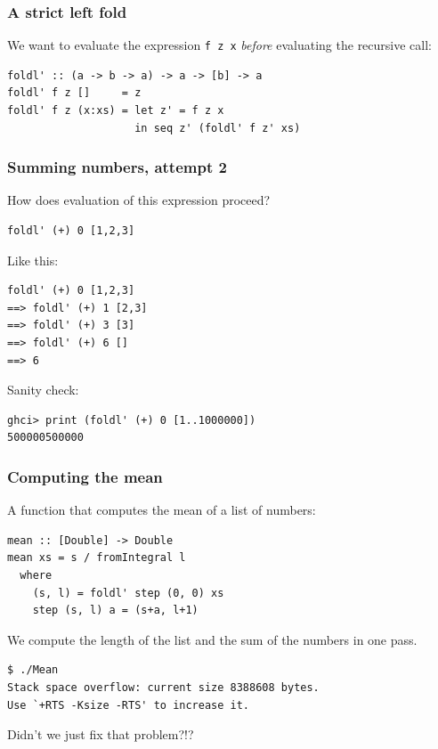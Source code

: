 \documentclass{beamer}
\begin{document}
\begin{frame}[fragile]
  \frametitle{A strict left fold}

  We want to evaluate the expression \lstinline!f z x! \emph{before}
  evaluating the recursive call:

  \begin{lstlisting}
foldl' :: (a -> b -> a) -> a -> [b] -> a
foldl' f z []     = z
foldl' f z (x:xs) = let z' = f z x
                    in seq z' (foldl' f z' xs)
  \end{lstlisting}
\end{frame}

\begin{frame}[fragile]
  \frametitle{Summing numbers, attempt 2}

  How does evaluation of this expression proceed?
\begin{verbatim}
foldl' (+) 0 [1,2,3]
\end{verbatim}

  Like this:
\begin{verbatim}
foldl' (+) 0 [1,2,3]
==> foldl' (+) 1 [2,3]
==> foldl' (+) 3 [3]
==> foldl' (+) 6 []
==> 6
\end{verbatim}

  Sanity check:
\begin{verbatim}
ghci> print (foldl' (+) 0 [1..1000000])
500000500000
\end{verbatim}
\end{frame}

\begin{frame}[fragile]
  \frametitle{Computing the mean}

  A function that computes the mean of a list of numbers:
  \begin{lstlisting}
mean :: [Double] -> Double
mean xs = s / fromIntegral l
  where
    (s, l) = foldl' step (0, 0) xs
    step (s, l) a = (s+a, l+1)
  \end{lstlisting}
  We compute the length of the list and the sum of the numbers in one
  pass.

\begin{verbatim}
$ ./Mean
Stack space overflow: current size 8388608 bytes.
Use `+RTS -Ksize -RTS' to increase it.
\end{verbatim}
Didn't we just fix that problem?!?
\end{frame}
\end{document}
